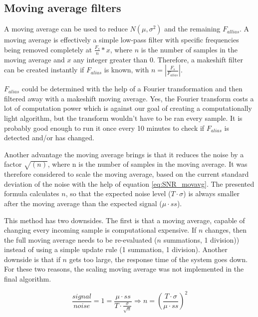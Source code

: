 \subsection{Moving average filters}
A moving average can be used to reduce $N(\mu,\sigma^2)$ and the remaining $F_{allias}$. A moving average is effectively a simple low-pass filter with specific frequencies being removed completely at $\frac{F_s}{n}*x$, where $n$ is the number of samples in the moving average and $x$ any integer greater than 0. Therefore, a makeshift filter can be created instantly if $F_{alias}$ is known, with $n = \left|\frac{F_{s}}{F_{alias}}\right|$.

$F_{alias}$ could be determined with the help of a Fourier transformation and then filtered away with a makeshift moving average. Yes, the Fourier transform costs a lot of computation power which is against our goal of creating a computationally light algorithm, but the transform wouldn't have to be ran every sample. It is probably good enough to run it once every 10 minutes to check if $F_{alias}$ is detected and/or has changed.

Another advantage the moving average brings is that it reduces the noise by a factor $\sqrt{(n)}$, where n is the number of samples in the moving average. It was therefore considered to scale the moving average, based on the current standard deviation of the noise with the help of equation \ref{eq:SNR_movavg}. The presented formula calculates $n$, so that the expected noise level ($T \cdot \sigma$) is always smaller after the moving average than the expected signal ($\mu\cdot ss$).

This method has two downsides. The first is that a moving average, capable of changing every incoming sample is computational expensive. If $n$ changes, then the full moving average needs to be re-evaluated ($n$ summations, 1 division)) instead of using a simple update rule (1 summation, 1 division). Another downside is that if $n$ gets too large, the response time of the system goes down. For these two reasons, the scaling moving average was not implemented in the final algorithm.

\begin{equation}
\label{eq:SNR_movavg}
\frac{signal}{noise} = 1 = \frac{\mu \cdot ss}{T \cdot \frac{\sigma}{\sqrt{n}}} \Rightarrow n = \left(\frac{T \cdot \sigma}{\mu\cdot ss}\right)^2
\end{equation}

